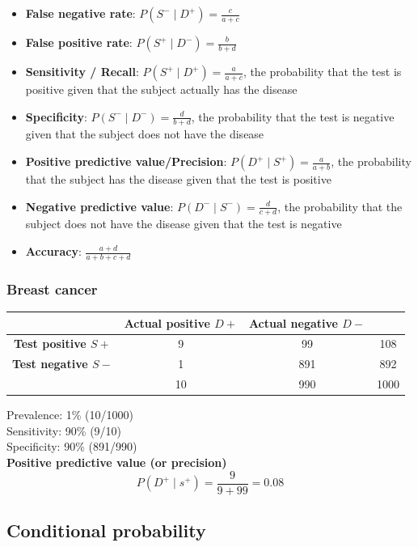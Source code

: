 \documentclass[a4paper]{article}\usepackage[]{graphicx}\usepackage[]{xcolor}
\begin{document}
\begin{itemize}
	\item \textbf{False negative rate}: \( P(S^- \mid D^+) = \frac{c}{a + c} \) 
	\item \textbf{False positive rate}: \( P(S^+ \mid D^-) = \frac{b}{b + d} \)
	\item \textbf{Sensitivity / Recall}: \( P(S^+ \mid D^+) = \frac{a}{a + c} \), the probability that the test is positive given that the subject actually has the disease
	\item \textbf{Specificity}: \( P(S^- \mid D^-) = \frac{d}{b + d} \), the probability that the test is negative given that the subject does not have the disease
	\item \textbf{Positive predictive value/Precision}: \( P(D^+ \mid S^+) = \frac{a}{a + b} \), the probability that the subject has the disease given that the test is positive
	\item \textbf{Negative predictive value}: \( P(D^- \mid S^-) = \frac{d}{c + d} \), the probability that the subject does not have the disease given that the test is negative
	\item \textbf{Accuracy}: \( \frac{a + d}{a + b + c + d} \) 
\end{itemize}
\subsubsection{Breast cancer}
\begin{table}[H]
	\centering
	\begin{tabular}{@{}cccc@{}}
	\toprule
	& \textcolor{mygreen}{\textbf{Actual positive \( D+ \)}} & \textcolor{mygreen}{\textbf{Actual negative \( D- \)}} \\ \midrule
	\textcolor{myred}{\textbf{Test positive \( S+ \)}} & 9  & 99   & 108 \\
	\textcolor{myred}{\textbf{Test negative \( S- \)}} & 1  & 891  & 892 \\
													   & 10 & 990 & 1000 \\ \bottomrule
	\end{tabular}
\end{table}
Prevalence: 1\% (10/1000)\\
Sensitivity: 90\% (9/10)\\
Specificity: 90\% (891/990)\\
\textbf{Positive predictive value (or precision)}
\[
	P(D^+ \mid s^+) = \frac{9}{9+99} = 0.08
\]
\subsection{Conditional probability}
\end{document}
